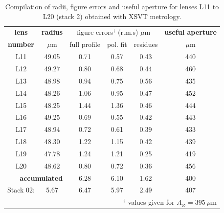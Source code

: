 \begin{refsection}
\begin{table}[t]
\caption[Lens stack 2 main parameters from XSVT metrology]{Compilation of radii, figure errors and useful aperture for lenses L11 to L20 (stack 2) obtained with XSVT metrology.}
\centering
\label{tab:CDo}\small
\begin{tabular}{cccccc} \hline \hline
\textbf{lens}      & \textbf{radius}  & \multicolumn{3}{c}{figure errors$^\dagger$ (r.m.s) $\mu$m}   & \textbf{useful aperture}\\ \cline{3-5}  
\textbf{number}    & $\mu$m           & full profile & pol. fit   & residues                                         & $\mu$m\\ \hline
L11                &49.05   &0.71   &0.57   &0.43      &440\\
L12                &49.27   &0.80   &0.68   &0.44      &460\\
L13                &48.98   &0.94   &0.75   &0.56      &435\\
L14                &48.26   &1.06   &0.95   &0.47      &452\\
L15                &48.25   &1.44   &1.36   &0.46      &444\\
L16                &49.25   &0.69   &0.55   &0.42      &443\\
L17                &48.94   &0.72   &0.61   &0.39      &433\\
L18                &48.30   &1.22   &1.15   &0.42      &439\\
L19                &47.78   &1.24   &1.21   &0.25      &419\\
L20                &48.62   &0.80   &0.72   &0.36      &456\\
\hline
\multicolumn{2}{r}{\textbf{accumulated}}      &6.28    & 6.10  &1.62 &400\\
\hline
Stack 02:           &5.67    &6.47   &5.97   &2.49  &407\\
\hline \hline
\multicolumn{6}{r}{\footnotesize{$^\dagger$ values given for $A_{\diameter}=395~\mu\text{m}$}}       
\end{tabular}
\end{table}


\end{refsection}
